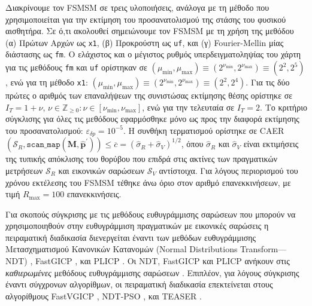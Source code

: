 Διακρίνουμε τον FSMSM σε τρεις υλοποιήσεις, ανάλογα με τη μέθοδο που
χρησιμοποιείται για την εκτίμηση του προσανατολισμού της στάσης του φυσικού
αισθητήρα. Σε ό,τι ακολουθεί σημειώνουμε τον FSMSM με τη χρήση της μεθόδου (α)
Πρώτων Αρχών ως \texttt{x1}, (β) Προκρούστη ως \texttt{uf}, και (γ)
Fourier-Mellin μίας διάστασης ως \texttt{fm}. Ο ελάχιστος και ο μέγιστος ρυθμός
υπερδειγματοληψίας του χάρτη για τις μεθόδους \texttt{fm} και \texttt{uf}
ορίστηκαν σε $(\mu_{\min},\mu_{\max}) \equiv (2^{\nu_{\min}},2^{\nu_{\max}})
\equiv (2^2,2^5)$, ενώ για τη μέθοδο \texttt{x1}: $(\mu_{\min},\mu_{\max})
\equiv (2^{\nu_{\min}},2^{\nu_{\max}}) \equiv (2^2,2^4)$. Για τις δύο πρώτες ο
αριθμός των επαναλήψεων της συνιστώσας εκτίμησης θέσης ορίστηκε σε $I_T=1+\nu$,
$\nu \in \mathbb{Z}_{\geq 0}: \nu \in [\nu_{\min}, \nu_{\max}]$, ενώ για την
τελευταία σε $I_T = 2$.  Το κριτήριο σύγκλισης για όλες τις μεθόδους
εφαρμόσθηκε μόνο ως προς την διαφορά εκτίμησης του προσανατολισμού:
$\varepsilon_{\delta p} = 10^{-5}$.  Η συνθήκη τερματισμού ορίστηκε σε
CAER$(\mathcal{S}_R, \texttt{scan\_map}(\bm{M}, \hat{\bm{p}}^\prime)) \leq
\overline{c} = (\hat{\sigma}_R + \hat{\sigma}_V)^{1/2}$, όπου $\hat{\sigma}_R$
και $\hat{\sigma}_V$ είναι εκτιμήσεις της τυπικής απόκλισης του θορύβου που
επιδρά στις ακτίνες των πραγματικών μετρήσεων $\mathcal{S}_R$ και εικονικών
σαρώσεων $\mathcal{S}_V$ αντίστοιχα. Για λόγους περιορισμού του χρόνου
εκτέλεσης του FSMSM τέθηκε άνω όριο στον αριθμό επανεκκινήσεων, με τιμή
$R_{\max} = 100$ επανεκκινήσεις.

Για σκοπούς σύγκρισης με τις μεθόδους ευθυγράμμισης σαρώσεων που μπορούν να
χρησιμοποιηθούν στην ευθυγράμμιση πραγματικών με εικονικές σαρώσεις η
πειραματική διαδικασία διενεργείται έναντι των μεθόδων ευθυγράμμισης
Μετασχηματισμού Κανονικών Κατανομών (Normal Distributions Transform---NDT)
\cite{Bibera,ndt_code}, FastGICP \cite{Segal2009a,fgicp_code}, και PLICP
\cite{Censi2008a,plicp_code}. Οι NDT, FastGICP και PLICP ανήκουν στις
\textit{καθιερωμένες} μεθόδους ευθυγράμμισης σαρώσεων
\cite{Koide2021a,Xu2018b,Sobreira2019b,Pishehvari2019b,Qingshan2019c,Pham2021b}.
Επιπλέον, για λόγους σύγκρισης έναντι σύγχρονων αλγορίθμων, οι πειραματική
διαδικασία επεκτείνεται στους αλγορίθμους FastVGICP
\cite{Koide2021a,fgicp_code}, NDT-PSO \cite{Bouraine2021,ndt_pso_code}, και
TEASER \cite{Yang2021,teaser_code}.


